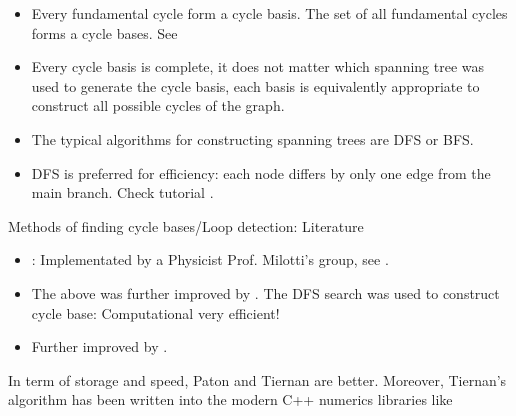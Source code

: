 \documentclass[xcolor=dvipsnames]{beamer}
\begin{document}
\begin{frame}
\begin{itemize}
	\item Every fundamental cycle form a cycle basis. The set of all fundamental cycles forms a cycle bases. See 
	\href{http://www.math.cmu.edu/~mradclif/teaching/241F18/CycleBases.pdf}{}
	\item Every cycle basis is complete, it does not matter which spanning tree was used to generate the cycle basis,
	each basis is equivalently appropriate to construct all possible cycles of the graph.
	\item The typical algorithms for constructing spanning trees are DFS or BFS. 
	\item DFS is preferred for efficiency: each node differs by only one edge from the main branch. Check tutorial 
	\href{http://courses.ics.hawaii.edu/ReviewICS241/morea/trees/SpanningTrees-QA.pdf}{}.
\end{itemize}	
\end{frame}
\begin{frame}{Methods of finding cycle bases/Loop detection: Literature}
	\begin{itemize}
		\item  \href{https://dl.acm.org/doi/pdf/10.1145/363848.363861}{}: Implementated by a Physicist Prof. Milotti's group, see \href{https://github.com/edymil/CircuitMath}{}.
		\item The above was further improved by \href{http://www.cs.kent.edu/~dragan/GraphAn/CycleBasis/p514-paton.pdf}{}. The DFS search was used to construct cycle base: Computational very efficient!
		\item Further improved by \href{https://dl.acm.org/doi/pdf/10.1145/362814.362819}{}. %
	\end{itemize}
	In term of storage and speed, Paton and Tiernan are better. Moreover, Tiernan's algorithm has been written into the modern C++ numerics libraries like \href{https://www.boost.org/}{}
\end{frame}
\end{document}
